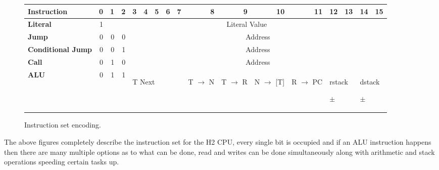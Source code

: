 \documentclass	[a4paper, 10pt]	{article}
\begin{document}
\begin{figure}[ht]
\begin{minipage}[t]{0.45\linewidth}
  \end{minipage}
  \begin{minipage}[b]{\linewidth}
    \small
\hspace*{-1cm}
    \begin{tabular}{|l|r|r|r|l|l|l|l|l|l|l|l|l|l|l|l|l|}
      \hline
      \textbf{Instruction} & 0 & 1 & 2 & \multicolumn{1}{r|}{3} & \multicolumn{1}{r|}{4} & \multicolumn{1}{r|}{5} & \multicolumn{1}{r|}{6} & \multicolumn{1}{r|}{7} & \multicolumn{1}{r|}{8} & \multicolumn{1}{r|}{9} & \multicolumn{1}{r|}{10} & \multicolumn{1}{r|}{11} & \multicolumn{1}{r|}{12} & \multicolumn{1}{r|}{13} & \multicolumn{1}{r|}{14} & \multicolumn{1}{r|}{15} \\ \hline
      \textbf{Literal} & 1 & \multicolumn{ 15}{c|}{Literal Value} \\ \hline
      \textbf{Jump} & 0 & 0 & 0 & \multicolumn{ 13}{c|}{Address} \\ \hline
      \textbf{Conditional Jump} & 0 & 0 & 1 & \multicolumn{ 13}{c|}{Address} \\ \hline
      \textbf{Call} & 0 & 1 & 0 & \multicolumn{ 13}{c|}{Address} \\ \hline
      \textbf{ALU}  & 0 & 1 & 1 & \multicolumn{ 5}{l|}{\hspace{1.2cm}\begin{sideways}T Next\end{sideways}} & \begin{sideways}T $\to$ N\end{sideways} & \begin{sideways}T $\to$ R \end{sideways}& \begin{sideways}N $\to$ [T] \end{sideways}& \begin{sideways}R $\to$ PC\end{sideways} & \multicolumn{ 2}{l|}{\hspace{0.3cm}\begin{sideways}rstack\end{sideways} \begin{sideways}$\pm$\end{sideways}} & \multicolumn{ 2}{l|}{\hspace{0.3cm}\begin{sideways}dstack\end{sideways}\begin{sideways}$\pm$\end{sideways}} \\ \hline
    \end{tabular}
    \caption{Instruction set encoding.}
    \label{fig:Instruction set encoding.}
  \end{minipage}
\end{figure}
\FloatBarrier
\clearpage
      The above figures completely describe the instruction set for the H2 CPU, every single bit is occupied
      and if an ALU instruction happens then there are many multiple options as to what can be done, read and
      writes can be done simultaneously along with arithmetic and stack operations speeding certain tasks up.
\end{document}
